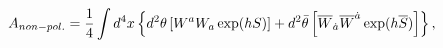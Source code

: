 \begin{equation}
A_{non-pol.}=\frac{1}{4}\int d^{4}x\left\{ d^{2}\theta \left[ W^{a}W_{a}\exp
(hS)\right] +d^{2}\bar{\theta}\left[ \overline{W}_{\dot{a}}\overline{W}^{%
\dot{a}}\exp (h\overline{S})\right] \right\} ,  \label{expon}
\end{equation}

